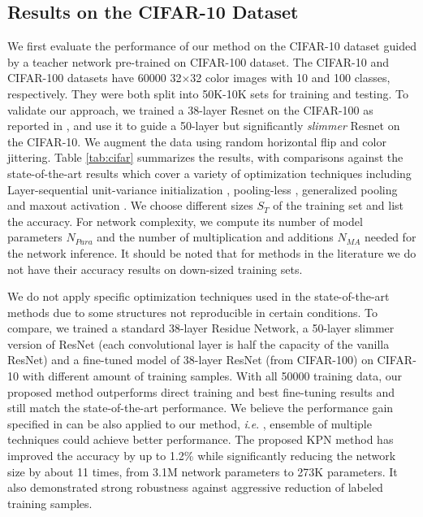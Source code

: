 \documentclass[journal]{IEEEtran}
\newcommand{\ie}{\textit{i}.\textit{e}. }
\begin{document}
\subsection{Results on the CIFAR-10 Dataset}

We first evaluate the performance of our method on the CIFAR-10 dataset guided by a teacher network pre-trained on  CIFAR-100 dataset. The CIFAR-10 and CIFAR-100 datasets \cite{krizhevsky2009learning} have 60000 32$\times$32 color images with 10 and 100 classes, respectively. They were both split into 50K-10K sets for training and testing. To validate our approach, we trained a 38-layer Resnet on the CIFAR-100 as reported in \cite{he2016deep}, and use it to guide a 50-layer but significantly \textit{slimmer} Resnet on the CIFAR-10. We augment the data using random horizontal flip and color jittering. Table \ref{tab:cifar} summarizes the results, with comparisons against the state-of-the-art results which cover a variety of optimization techniques including Layer-sequential unit-variance initialization \cite{mishkin2015all}, pooling-less \cite{springenberg2014striving}, generalized pooling \cite{lee2016generalizing} and maxout activation \cite{goodfellow2013maxout}.  We choose different sizes $S_T$ of the training set and list the accuracy. For network complexity, we compute its number of model parameters $N_{Para}$ and the number of multiplication and additions $N_{MA}$ needed for the network inference.
It should be noted that for methods in the literature we do not have  their accuracy results on down-sized training sets.

We do not apply specific optimization techniques used in the state-of-the-art methods due to some structures not reproducible in certain conditions. To compare, we trained a standard 38-layer Residue Network, a 50-layer slimmer version of ResNet (each convolutional layer is half the capacity of the vanilla ResNet) and a fine-tuned model of 38-layer ResNet (from CIFAR-100) on CIFAR-10 with different amount of training samples.  With all 50000 training data, our proposed method outperforms direct training and best fine-tuning results and still match the state-of-the-art performance. 
We believe the performance gain specified in \cite{lee2016generalizing, mishkin2015all} can be also applied to our method, \ie, ensemble of multiple techniques could achieve better performance. The proposed KPN method has improved the accuracy by up to 1.2\% while significantly reducing the network size by about 11 times, from 3.1M network parameters to 273K parameters. It also demonstrated strong robustness against aggressive reduction of labeled training samples.
\end{document}

